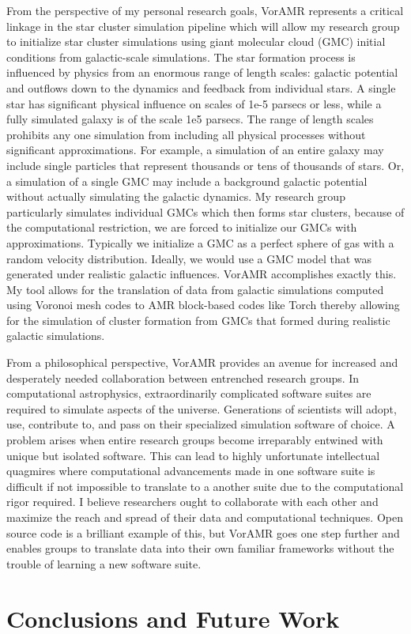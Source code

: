 \documentclass[twoside]{drexel-thesis}
\begin{document}
\begin{thesis}
From the perspective of my personal research goals, VorAMR represents a critical linkage in the star cluster simulation pipeline which will allow my research group to initialize star cluster simulations using giant molecular cloud (GMC) initial conditions from galactic-scale simulations. The star formation process is influenced by physics from an enormous range of length scales: galactic potential and outflows down to the dynamics and feedback from individual stars. A single star has significant physical influence on scales of 1e-5 parsecs or less, while a fully simulated galaxy is of the scale 1e5 parsecs. The range of length scales prohibits any one simulation from including all physical processes without significant approximations. For example, a simulation of an entire galaxy may include single particles that represent thousands or tens of thousands of stars. Or, a simulation of a single GMC may include a background galactic potential without actually simulating the galactic dynamics. My research group particularly simulates individual GMCs which then forms star clusters, because of the computational restriction, we are forced to initialize our GMCs with approximations. Typically we initialize a GMC as a perfect sphere of gas with a random velocity distribution. Ideally, we would use a GMC model that was generated under realistic galactic influences. VorAMR accomplishes exactly this. My tool allows for the translation of data from galactic simulations computed using Voronoi mesh codes to AMR block-based codes like Torch thereby allowing for the simulation of cluster formation from GMCs that formed during realistic galactic simulations.

From a philosophical perspective, VorAMR provides an avenue for increased and desperately needed collaboration between entrenched research groups. In computational astrophysics, extraordinarily complicated software suites are required to simulate aspects of the universe. Generations of scientists will adopt, use, contribute to, and pass on their specialized simulation software of choice. A problem arises when entire research groups become irreparably entwined with unique but isolated software. This can lead to highly unfortunate intellectual quagmires where computational advancements made in one software suite is difficult if not impossible to translate to a another suite due to the computational rigor required. I believe researchers ought to collaborate with each other and maximize the reach and spread of their data and computational techniques. Open source code is a brilliant example of this, but VorAMR goes one step further and enables groups to translate data into their own familiar frameworks without the trouble of learning a new software suite.
\chapter{Conclusions and Future Work}

\end{thesis}


\appendix %

\begin{vita} %
\end{vita}
\end{document}
